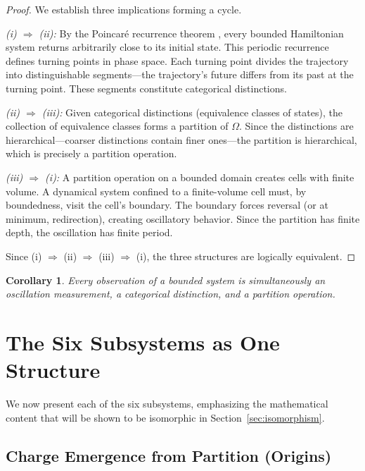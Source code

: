 \documentclass[twocolumn,10pt,a4paper]{article}
\newtheorem{corollary}[theorem]{Corollary}
\theoremstyle{definition}
\theoremstyle{remark}
\begin{document}
\begin{proof}
We establish three implications forming a cycle.

\emph{(i) $\Rightarrow$ (ii):} By the Poincar\'e recurrence theorem \citep{Strogatz1994}, every bounded Hamiltonian system returns arbitrarily close to its initial state. This periodic recurrence defines turning points in phase space. Each turning point divides the trajectory into distinguishable segments---the trajectory's future differs from its past at the turning point. These segments constitute categorical distinctions.

\emph{(ii) $\Rightarrow$ (iii):} Given categorical distinctions (equivalence classes of states), the collection of equivalence classes forms a partition of $\Omega$. Since the distinctions are hierarchical---coarser distinctions contain finer ones---the partition is hierarchical, which is precisely a partition operation.

\emph{(iii) $\Rightarrow$ (i):} A partition operation on a bounded domain creates cells with finite volume. A dynamical system confined to a finite-volume cell must, by boundedness, visit the cell's boundary. The boundary forces reversal (or at minimum, redirection), creating oscillatory behavior. Since the partition has finite depth, the oscillation has finite period.

Since (i) $\Rightarrow$ (ii) $\Rightarrow$ (iii) $\Rightarrow$ (i), the three structures are logically equivalent.
\end{proof}

\begin{corollary}
Every observation of a bounded system is simultaneously an oscillation measurement, a categorical distinction, and a partition operation.
\end{corollary}

\section{The Six Subsystems as One Structure}
\label{sec:subsystems}

We now present each of the six subsystems, emphasizing the mathematical content that will be shown to be isomorphic in Section~\ref{sec:isomorphism}.

\subsection{Charge Emergence from Partition (Origins)}
\label{sec:charge}
\end{document}
